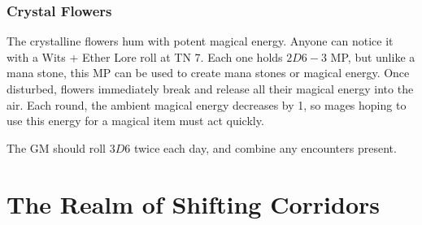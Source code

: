 \begin{multicols}{2}
\subsubsection{Crystal Flowers}

The crystalline flowers hum with potent magical energy.
Anyone can notice it with a Wits + Ether Lore roll at TN 7.
Each one holds $2D6-3$ MP, but unlike a mana stone, this MP can be used to create mana stones or magical energy.
Once disturbed, flowers immediately break and release all their magical energy into the air.
Each round, the ambient magical energy decreases by 1, so mages hoping to use this energy for a magical item must act quickly.

The GM should roll $3D6$ twice each day, and combine any encounters present.

\end{multicols}

\section{The Realm of Shifting Corridors}\label{shiftingcorridors}


